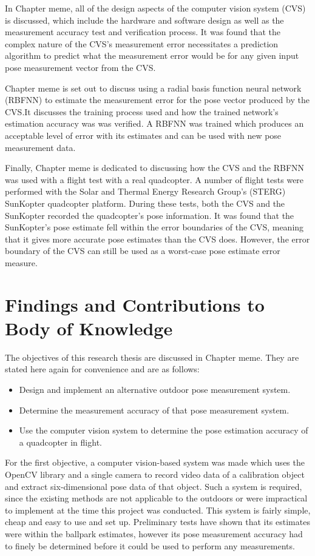 In Chapter meme, all of the design aspects of the computer vision system (CVS) is discussed, which include the hardware and software design as well as the measurement accuracy test and verification process. It was found that the complex nature of the CVS's measurement error necessitates a prediction algorithm to predict what the measurement error would be for any given input pose measurement vector from the CVS.\@ 

Chapter meme is set out to discuss using a radial basis function neural network (RBFNN) to estimate the measurement error for the pose vector produced by the CVS.\@ It discusses the training process used and how the trained network's estimation accuracy was was verified. A RBFNN was trained which produces an acceptable level of error with its estimates and can be used with new pose measurement data.

Finally, Chapter meme is dedicated to discussing how the CVS and the RBFNN was used with a flight test with a real quadcopter. A number of flight tests were performed with the Solar and Thermal Energy Research Group's (STERG) SunKopter quadcopter platform. During these tests, both the CVS and the SunKopter recorded the quadcopter's pose information. It was found that the SunKopter's pose estimate fell within the error boundaries of the CVS, meaning that it gives more accurate pose estimates than the CVS does. However, the error boundary of the CVS can still be used as a worst-case pose estimate error measure. 

\section{Findings and Contributions to Body of Knowledge}

The objectives of this research thesis are discussed in Chapter meme. They are stated here again for convenience and are as follows:

\begin{itemize}
  \item Design and implement an alternative outdoor pose measurement system.
  \item Determine the measurement accuracy of that pose measurement system.
  \item Use the computer vision system to determine the pose estimation accuracy of a quadcopter in flight. 
\end{itemize}

For the first objective, a computer vision-based system was made which uses the OpenCV library and a single camera to record video data of a calibration object and extract six-dimensional pose data of that object. Such a system is required, since the existing methods are not applicable to the outdoors or were impractical to implement at the time this project was conducted. This system is fairly simple, cheap and easy to use and set up. Preliminary tests have shown that its estimates were within the ballpark estimates, however its pose measurement accuracy had to finely be determined before it could be used to perform any measurements. 

